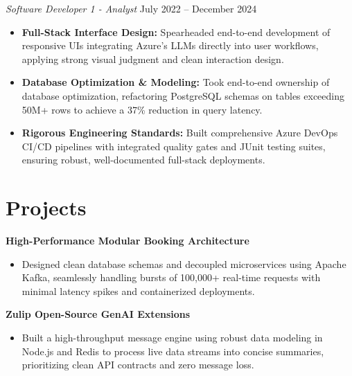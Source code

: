 \documentclass[11pt,a4paper]{article}
\begin{document}
\vspace{3pt}
\noindent
\textit{Software Developer 1 - Analyst} \hfill July 2022 -- December 2024
\begin{itemize}[leftmargin=*,noitemsep,topsep=0pt]
    \item \textbf{Full-Stack Interface Design:} Spearheaded end-to-end development of responsive UIs integrating Azure's LLMs directly into user workflows, applying strong visual judgment and clean interaction design.
    \item \textbf{Database Optimization \& Modeling:} Took end-to-end ownership of database optimization, refactoring PostgreSQL schemas on tables exceeding 50M+ rows to achieve a 37\% reduction in query latency.
    \item \textbf{Rigorous Engineering Standards:} Built comprehensive Azure DevOps CI/CD pipelines with integrated quality gates and JUnit testing suites, ensuring robust, well-documented full-stack deployments.
\end{itemize}

\vspace{-5pt}
\section{Projects}
\noindent
\textbf{High-Performance Modular Booking Architecture}
\begin{itemize}[leftmargin=*,noitemsep,topsep=0pt]
    \item Designed clean database schemas and decoupled microservices using Apache Kafka, seamlessly handling bursts of 100,000+ real-time requests with minimal latency spikes and containerized deployments.
\end{itemize}

\vspace{3pt}
\noindent
\textbf{Zulip Open-Source GenAI Extensions}
\begin{itemize}[leftmargin=*,noitemsep,topsep=0pt]
    \item Built a high-throughput message engine using robust data modeling in Node.js and Redis to process live data streams into concise summaries, prioritizing clean API contracts and zero message loss.
\end{itemize}
\end{document}
